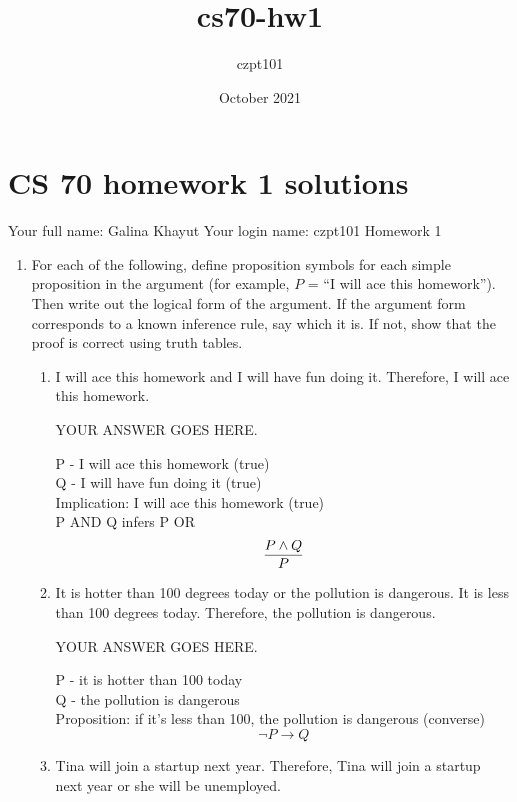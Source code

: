 \documentclass{article}
\title{cs70-hw1}
\author{czpt101 }
\date{October 2021}
\begin{document}
\maketitle

\newcommand{\mbf}[1]{\mbox{{\bfseries #1}}}
\newcommand{\N}{\mbf{N}}
\newcommand{\Z}{\mbf{Z}}

\section*{CS 70 homework 1 solutions}

Your full name: Galina Khayut
\newline
Your login name: czpt101
\newline
Homework 1

\begin{enumerate}

\item
For each of the following, define proposition
symbols for each simple proposition in the argument (for example, $P$ =
``I will ace this homework''). Then write out the logical form of
the argument. If the argument form corresponds to a known inference
rule, say which it is. If not, show that the proof is correct using
truth tables.
\begin{enumerate}
\item  I will ace this homework and I will have fun doing it.
Therefore, I will ace this homework.

YOUR ANSWER GOES HERE.

P - I will ace this homework (true) \\
Q - I will have fun doing it (true) \\
Implication: I will ace this homework (true) \\ 
P AND Q infers P OR \[ \infer {P}{P \wedge Q} \]

\item It is hotter than 100 degrees today or the pollution is
dangerous. It is less than 100 degrees today. Therefore, the pollution
is dangerous.

YOUR ANSWER GOES HERE.

P - it is hotter than 100 today \\
Q - the pollution is dangerous \\
Proposition: if it's less than 100, the pollution is dangerous (converse) \\
\[ \neg P \to Q \] 

\item Tina will join a startup next year. Therefore,
Tina will join a startup next year or she will be unemployed.


\end{enumerate}
\end{enumerate}
\end{document}
